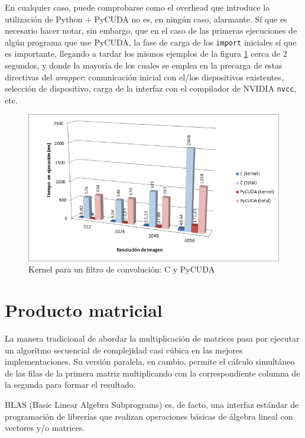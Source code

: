 \documentclass[twocolumn,twoside]{Jornadas}
\begin{document}

En cualquier caso, puede comprobarse como el overhead que introduce la utilización de Python + PyCUDA no es, en ningún caso, alarmante. Sí que es necesario hacer notar, sin embargo, que en el caso de las primeras ejecuciones de algún programa que use PyCUDA, la fase de carga de los {\tt import} iniciales sí que es importante, llegando a tardar los mismos ejemplos de la figura \ref{fig:overhead-convolucion} cerca de 2 segundos, y donde la mayoría de los cuales se emplea en la precarga de estas directivas del \emph{wrapper}: comunicación inicial con el/los dispositivos existentes, selección de dispositivo, carga de la interfaz con el compilador de NVIDIA {\tt nvcc}, etc.

\begin{figure}
   \begin{center}
      \includegraphics[width=.5\textwidth]{overhead-convolucion.png}
      \caption{\label{fig:overhead-convolucion}Kernel para un filtro de convolución: C y PyCUDA}
   \end{center}
\end{figure}


\section{Producto matricial}

La manera tradicional de abordar la multiplicación de matrices pasa por ejecutar un algoritmo secuencial de complejidad casi cúbica en las mejores implementaciones. Su versión paralela, en cambio, permite el cálculo simultáneo de las filas de la primera matriz multiplicando con la correspondiente columna de la segunda para formar el resultado.


BLAS (Basic Linear Algebra Subprograms) es, de facto, una interfaz estándar de programación de librerías que realizan operaciones básicas de álgebra lineal con vectores y/o matrices.
\end{document}
